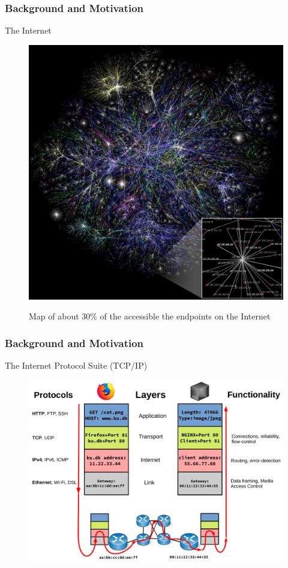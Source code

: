 \begin{frame}
\frametitle{Background and Motivation}
The Internet

\begin{figure}
	\centering
\includegraphics[scale=0.14]{./background/internet_map.jpg}
\label{fig: Internet map}
\caption{Map of about 30\% of the accessible the endpoints on the Internet}
\end{figure}

\end{frame}


\begin{frame}
\frametitle{Background and Motivation}
The Internet Protocol Suite (TCP/IP)
\begin{figure}
	\centering
\includegraphics[scale=0.27]{./background/internet_scenario.pdf}
\end{figure}
\end{frame}

